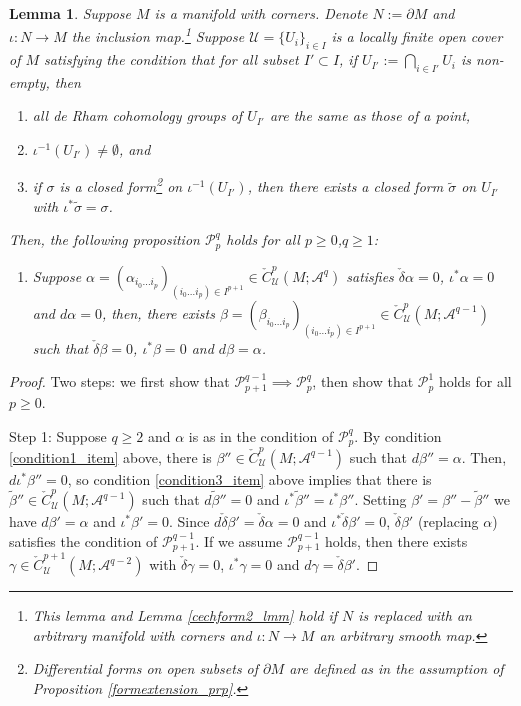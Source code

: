\documentclass[11pt]{article}
\newtheorem{lmm}[thm]{Lemma}
\theoremstyle{definition}
\theoremstyle{remark}
\def\cA{\mathcal{A}}
\def\cP{\mathcal{P}}
\def\cU{\mathcal{U}}
\begin{document}
\begin{appendices}
\begin{lmm}\label{cechform_lmm}
Suppose $M$ is a manifold with corners. Denote $N:=\partial M$ and $\iota: N\to M$ the inclusion map.\footnote{This lemma and Lemma \ref{cechform2_lmm} hold if $N$ is replaced with an arbitrary manifold with corners and $\iota:N\to M$ an arbitrary smooth map.} 
Suppose $\cU=\{U_i\}_{i\in I}$ is a locally finite open cover of $M$ satisfying the condition that for all subset $I'\subset I$, if $U_{I'}:=\bigcap_{i\in I'}U_i$ is non-empty, then 
\begin{enumerate}
\item \label{condition1_item} all de Rham cohomology groups of $U_{I'}$ are the same as those of a point, 
\item \label{condition2_item} $\iota^{-1}(U_{I'})\neq\emptyset$, and 
\item \label{condition3_item} if $\sigma$ is a closed form\footnote{Differential forms on open subsets of $\partial M$ are defined as in the assumption of Proposition \ref{formextension_prp}.} on $\iota^{-1}(U_{I'})$, then there exists a closed form $\tilde\sigma$ on $U_{I'}$ with $\iota^*\tilde\sigma=\sigma$. 
\end{enumerate}
Then, the following proposition $\cP^q_p$ holds for all $p\ge0$,$q\ge1$: 
\begin{enumerate}[noitemsep, nolistsep, label=$\cP^q_p$:]
\item Suppose 
$\alpha=(\alpha_{i_0\ldots i_p})_{(i_0\ldots i_p)\in I^{p+1}}\in\check{C}^p_{\cU}(M;\cA^q)$
satisfies $\check{\delta}\alpha=0$, $\iota^*\alpha=0$ and $d\alpha=0$,
then, there exists 
$\beta=(\beta_{i_0\ldots i_p})_{(i_0\ldots i_p)\in I^{p+1}}\in\check{C}^p_{\cU}(M;\cA^{q-1})$
such that $\check{\delta}\beta=0$, $\iota^*\beta=0$ and $d\beta=\alpha$. 
\end{enumerate}
\end{lmm}
\begin{proof}
Two steps: we first show that $\cP^{q-1}_{p+1}\implies\cP^{q}_p$, then show that $\cP^1_{p}$ holds for all $p\ge0$. 

Step 1: Suppose $q\ge2$ and $\alpha$ is as in the condition of $\cP^q_p$. 
By condition \ref{condition1_item} above, there is $\beta''\in\check{C}^p_{\cU}(M;\cA^{q-1})$ such that $d\beta''=\alpha$. Then, $d\iota^*\beta''=0$, so condition \ref{condition3_item} above implies that there is $\tilde\beta''\in\check{C}^p_{\cU}(M;\cA^{q-1})$ such that $d\tilde\beta''=0$ and $\iota^*\tilde\beta''=\iota^*\beta''$.
Setting $\beta'=\beta''-\tilde\beta''$ we have $d\beta'=\alpha$ and $\iota^*\beta'=0$. 
Since $d\check\delta \beta'=\check\delta\alpha=0$ and $\iota^*\check\delta\beta'=0$, $\check\delta\beta'$ (replacing $\alpha$) satisfies the condition of $\cP^{q-1}_{p+1}$. 
If we assume $\cP^{q-1}_{p+1}$ holds, then there exists $\gamma\in\check{C}^{p+1}_{\cU}(M;\cA^{q-2})$ with $\check\delta\gamma=0$, $\iota^*\gamma=0$ and $d\gamma=\check\delta\beta'$. 


\end{proof}
\end{appendices}
\end{document}
